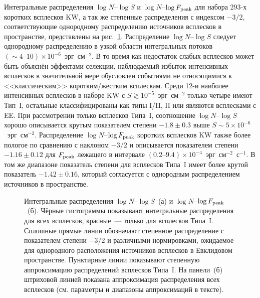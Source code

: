 Интегральные распределения $\log N$--$\log S$ и $\log N$--$\log F_{\mathrm{peak}}$
для набора 293-х коротких всплесков KW, а так же степенные распределения с индексом $-3/2$, 
соответствующие однородному распределению источников всплесков в пространстве,
представлены на рис.~\ref{fig:logNlogS_PF}.
Распределение $\log N$--$\log S$ следует однородному распределению в узкой 
области интегральных потоков $(\sim 4\textrm{--}10)\times 10^{-6}$~эрг~см$^{-2}$.
В то время как недостаток слабых всплесков может быть объяснён эффектами селекции,
наблюдаемый избыток интенсивных всплесков в значительной мере обусловлен событиями 
не относящимися к <<классическим>> коротким/жестким всплескам. Среди 12-и наиболее 
интенсивных всплесков в наборе KW с $S \gtrsim 10^{-5}$~эрг~см$^{-2}$ только 
четыре имеют Тип~I, остальные классифицированы как типы I/II, II или являются всплесками с EE.
При рассмотрении только всплесков Типа~I, соотношение $\log N$--$\log S$ хорошо 
описывается крутым показателем степени $-1.8 \pm 0.3$ выше $S\sim 5\times 10^{-6}$~эрг~см$^{-2}$.
Распределение $\log N$--$\log F_{\mathrm{peak}}$ коротких всплесков KW также более пологое 
по сравнению с наклоном $-3/2$ и описывается показателем степени 
$-1.16 \pm 0.12$ для $F_{\mathrm{peak}}$ лежащего в интервале
$(0.2\textrm{--}9.4)\times 10^{-4}$~эрг~см$^{-2}$~с$^{-1}$.
В том же диапазоне показатель степени для всплесков Типа~I имеет более крутой показатель 
$-1.42 \pm 0.16$, который согласуется с однородным распределением источников в пространстве.

\begin{figure}
    \begin{minipage}[h]{0.5\textwidth}
    \end{minipage}
    \hfill
    \begin{minipage}[h]{0.5\textwidth}
	\end{minipage}
\caption{
    Интегральные распределения $\log N$--$\log S$~(а) и $\log N$--$\log F_{\mathrm{peak}}$~(б).
    Чёрные гистограммы показывают интегральные распределения для всех всплесков, 
    красные~--- только для всплесков Типа~I. Сплошные прямые линии обозначают 
    степенное распределение с показателем степени $-3/2$ и различными нормировками, 
    ожидаемое для однородного расположения источников всплесков в Евклидовом пространстве.
    Пунктирные линии показывают степенную аппроксимацию распределений всплесков Типа~I.
    На панели~(б) штриховой линией показана аппроксимация распределения всех всплесков 
    (см. параметры и диапазоны аппроксимаций в тексте).
    \label{fig:logNlogS_PF} }
\end{figure}

